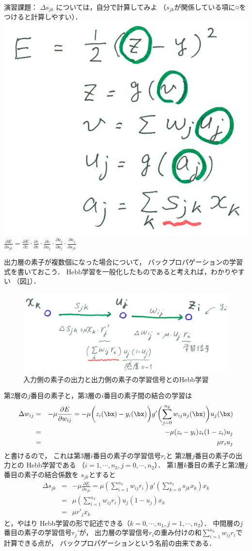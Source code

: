 \documentclass[a4paper,11pt]{jarticle}
\begin{document}
\noindent
{\gt 演習課題：}
$\Delta s_{jk}$ については，自分で計算してみよ
（$s_{jk}$が関係している項に○をつけると計算しやすい）．\\
\includegraphics[width=.3\linewidth]{figs/backpropagation_partial_derivative101.eps}
$
\frac{\partial E}{\partial s_{jk}} =
\frac{\partial E}{\partial z} \cdot
\frac{\partial z}{\partial v} \cdot
\frac{\partial v}{\partial u_j} \cdot
\frac{\partial u_j}{\partial a_j} \cdot
\frac{\partial a_j}{\partial s_{jk}} 
$
\vspace*{10mm}

出力層の素子が複数個になった場合について，
バックプロパゲーションの学習式を書いておこう．
Hebb学習を一般化したものであると考えれば，わかりやすい
（図\ref{fig:ghebb}）．
\begin{figure}[hbt]
\begin{center}
 \includegraphics[width=.7\linewidth]{figs/generalized_hebb101.eps}
\caption{入力側の素子の出力と出力側の素子の学習信号とのHebb学習\label{fig:ghebb}}
\end{center}
\end{figure}

第2層の$j$番目の素子と，第3層の$i$番目の素子間の結合の学習は
\begin{eqnarray}
\Delta w_{ij} 
& = & - \mu \frac{\partial E}{\partial w_{ij}} 
 =  -\mu
 \biggl ( z_i(\bx) - y_i(\bx)
\biggr )
g' \biggl ( \sum_{j=0}^{n_2} w_{ij} u_j(\bx)  \biggr )
u_j(\bx) \\
%
& = & -\mu
( z_i - y_i  )
 z_i (1-z_i)
u_j 
\\
& = & \mu r_i  u_j
\end{eqnarray}
と書けるので，
これは第3層$i$番目の素子の学習信号$r_i$と
第2層$j$番目の素子の出力との Hebb学習である
（$i=1,\cdots,n_3, j=0,\cdots,n_2$）．
第1層$k$番目の素子と第2層$j$番目の素子の結合係数を
$s_{jk}$とすると
\begin{eqnarray}
\Delta s_{jk} 
& = & - \mu \frac{\partial E}{\partial s_{jk}} 
 =  \mu
\left ( \sum_{i=1}^{n_3} w_{ij} r_i \right ) 
g'\left ( \sum_{k=0}^{n_1} s_{jk} x_k \right ) x_k \\
& = & \mu
\left ( \sum_{i=1}^{n_3} w_{ij} r_i \right ) 
u_j(1-u_j)
x_k \\
& = & 
\mu r'_j  x_k
\end{eqnarray}
と，やはり Hebb学習の形で記述できる（$k=0,\cdots,n_1, j=1,\cdots,n_2$）．
中間層の$j$番目の素子の学習信号$r_j'$が，
出力層の学習信号$r_i$の重み付けの和$ \sum_{i=1}^{n_3} w_{ij} r_i $で計算できる点が，
バックプロパゲーションという名前の由来である．
\end{document}
